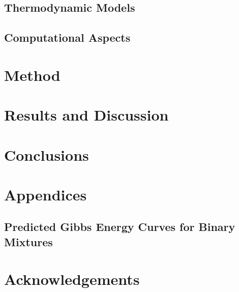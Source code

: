 \documentclass[a4paperm,bezier,amstex]{report}
\numberwithin{equation}{section}
\numberwithin{figure}{section}
\begin{document}
 		\section{Thermodynamic Models}
 		
	
		\section{Computational Aspects}
		
		

		
	\chapter{Method}
		
		

	
	\chapter{Results and Discussion}
		
				
	\chapter{Conclusions}
		
	\chapter{Appendices}
	\section{Predicted Gibbs Energy Curves for Binary Mixtures}\label{AppendixGibbsPlotsBinaries}
		
	
	\chapter*{Acknowledgements}
							
		
	
	
		
\end{document}
